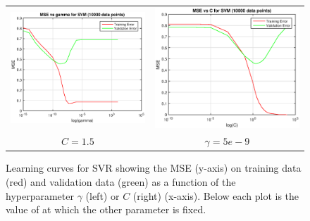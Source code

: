 \documentclass[12pt] {article}
\renewcommand{\baselinestretch}{1.2} %
\begin{document}
\renewcommand{\baselinestretch}{1.0} %
\begin{figure}[h!] \centering
\begin{tabular}{cc}
\includegraphics[width=.45\textwidth]{figdir/svmgamma10000.eps} &
\includegraphics[width=.45\textwidth]{figdir/svmc10000.eps} \\
$C=1.5$ & $\gamma=5e-9$ \\
\end{tabular}
\caption{Learning curves for SVR showing the MSE (y-axis) on training data (red) and validation data (green) as a function of the hyperparameter $\gamma$ (left) or $C$ (right) (x-axis). Below each plot is the value of at which the other parameter is fixed.}
\end{figure}
\renewcommand{\baselinestretch}{1.2} %
\end{document}
